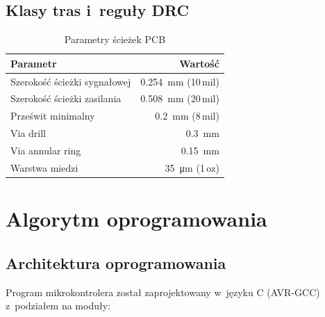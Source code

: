 \documentclass[a4paper,11pt]{article}
\begin{document}
\subsection{Klasy tras i~reguły DRC}

\begin{table}[H]
    \centering
    \caption{Parametry ścieżek PCB}
    \label{tab:pcb_rules}
    \begin{tabular}{lr}
        \toprule
        \textbf{Parametr} & \textbf{Wartość} \\
        \midrule
        Szerokość ścieżki sygnałowej & \SI{0,254}{\milli\metre} (10\,mil) \\
        Szerokość ścieżki zasilania & \SI{0,508}{\milli\metre} (20\,mil) \\
        Prześwit minimalny & \SI{0,2}{\milli\metre} (8\,mil) \\
        Via drill & \SI{0,3}{\milli\metre} \\
        Via annular ring & \SI{0,15}{\milli\metre} \\
        Warstwa miedzi & \SI{35}{\micro\metre} (1\,oz) \\
        \bottomrule
    \end{tabular}
\end{table}


\clearpage
\section{Algorytm oprogramowania}
\label{sec:algorytm}

\subsection{Architektura oprogramowania}

Program mikrokontrolera został zaprojektowany w~języku C (AVR-GCC) z~podziałem
na moduły:
\end{document}
